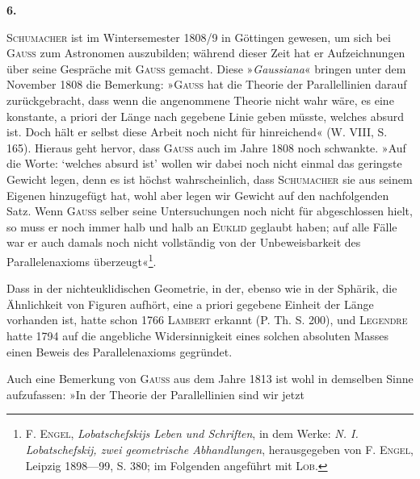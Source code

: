 \clearpage\begingroup{}
\renewcommand{\thefootnote}{\arabic{footnote})}\setcounter{footnote}{0}
\begin{center}\textbf{6.}\par\smallskip
{}
\end{center}
\noindent\hspace*{\parindent}\textsc{Schumacher} ist im Wintersemester 1808/9 in Göttingen gewesen, um sich
bei \textsc{Gauss} zum Astronomen auszubilden; während dieser Zeit hat er Aufzeichnungen
über seine Gespräche mit \textsc{Gauss} gemacht. Diese »\textit{Gaussiana}«
bringen unter dem November 1808 die Bemerkung: »\textsc{Gauss} hat die Theorie
der Parallellinien darauf zurückgebracht, dass wenn die angenommene Theorie
nicht wahr wäre, es eine konstante, a priori der Länge nach gegebene Linie
geben müsste, welches absurd ist. Doch hält er selbst diese Arbeit noch
nicht für hinreichend« (W. VIII, S. 165). Hieraus geht hervor, dass \textsc{Gauss}
auch im Jahre 1808 noch schwankte. »Auf die Worte: ‘welches absurd ist’
wollen wir dabei noch nicht einmal das geringste Gewicht legen, denn es ist
höchst wahrscheinlich, dass \textsc{Schumacher} sie aus seinem Eigenen hinzugefügt
hat, wohl aber legen wir Gewicht auf den nachfolgenden Satz. Wenn \textsc{Gauss}
selber seine Untersuchungen noch nicht für abgeschlossen hielt, so muss er
\clearpage{}\setcounter{footnote}{0}
\noindent noch immer halb und halb an \textsc{Euklid} geglaubt haben; auf alle Fälle war er
auch damals noch nicht vollständig von der Unbeweisbarkeit des Parallelenaxioms
überzeugt«\footnote{F. \textsc{Engel}, \textit{Lobatschefskijs Leben und Schriften}, in dem Werke: \textit{N. I. Lobatschefskij, zwei geometrische Abhandlungen}, herausgegeben von F. \textsc{Engel}, Leipzig 1898—99, S. 380; im Folgenden angeführt mit \textsc{Lob.}}.
\par
Dass in der nichteuklidischen Geometrie, in der, ebenso wie in der
Sphärik, die Ähnlichkeit von Figuren aufhört, eine a priori gegebene Einheit
der Länge vorhanden ist, hatte schon 1766 \textsc{Lambert} erkannt (P. Th. S. 200),
und \textsc{Legendre} hatte 1794 auf die angebliche Widersinnigkeit eines solchen
absoluten Masses einen Beweis des Parallelenaxioms gegründet.
\par
Auch eine Bemerkung von \textsc{Gauss} aus dem Jahre 1813 ist wohl in demselben
Sinne aufzufassen: »In der Theorie der Parallellinien sind wir jetzt
